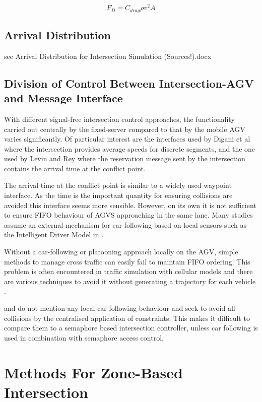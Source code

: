\begin{equation}
F_D = C_{drag} \rho v^2 A
\end{equation} 


\subsection{Arrival Distribution}
see Arrival Distribution for Intersection Simulation (Sources!).docx

\subsection{Division of Control Between Intersection-AGV and Message Interface}
With different signal-free intersection control approaches, the functionality carried out centrally by the fixed-server compared to that by the mobile AGV varies significantly. Of particular interest are the interfaces used by Digani et al \cite{Digani2019} where the intersection provides average speeds for discrete segments, and the one used by Levin and Rey \cite{Levin2017} where the reservation message sent by the intersection contains the arrival time at the conflict point. 

The arrival time at the conflict point is similar to a widely used waypoint interface. As the time is the important quantity for ensuring collisions are avoided this interface seems more sensible. However, on its own it is not sufficient to ensure FIFO behaviour of AGVS approaching in the same lane. Many studies assume an external mechanism for car-following based on local sensors such as the Intelligent Driver Model in \cite{He2020}.  

Without a car-following or platooning approach locally on the AGV, simple methods to manage cross traffic can easily fail to maintain FIFO ordering. This problem is often encountered in traffic simulation with cellular models and there are various techniques to avoid it without generating a trajectory for each vehicle \cite{Carey2014}. 

\cite{Levin2017} and \cite{Digani2019} do not mention any local car following behaviour and seek to avoid all collisions by the centralised application of constraints. This makes it difficult to compare them to a semaphore based intersection controller, unless car following is used in combination with semaphore access control.  

\section{Methods For Zone-Based Intersection}
